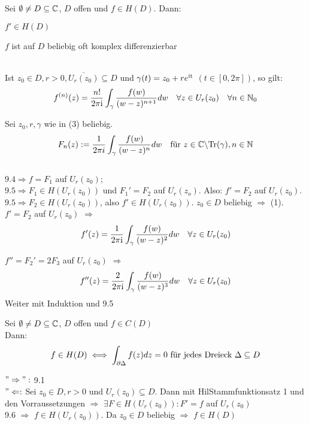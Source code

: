 \documentclass[a4paper,twoside,DIV15,BCOR12mm]{scrbook}
\def\gdw{\equizu}
\def\Tr{\text{Tr}}
\def\gdw{\equizu}
\def\ie{\rm i}
\begin{document}
\begin{satz}
Sei $\emptyset \neq D \subseteq \mathbb{C}$, $D$ offen und $f \in H(D)$. Dann:
\begin{liste}
\item $f' \in H(D)$
\item $f$ ist auf $D$ beliebig oft komplex differenzierbar
\item {} \\
      Ist $z_0 \in D, r>0, \overline{U_r(z_0)} \subseteq D$ und $\gamma(t) = z_0+ r e^{\ie t}$
       $(t \in [0, 2\pi])$, so gilt: \\
       \[f^{(n)}(z) = \frac{n!}{2\pi \ie} \int_{\gamma}
       \frac{f(w)}{(w-z)^{n+1}} dw \quad \forall z \in U_r(z_0) \quad \forall n
       \in \MdN_0 \] 
      
\end{liste}

\end{satz}
\begin{beweis}
Sei $z_0, r, \gamma$ wie in (3) beliebig. \\
\[ F_n(z) :=\frac{1}{2\pi i} \int_{\gamma} \frac{f(w)}{(w-z)^n} dw \quad \text{für } z\in \MdC
\backslash \Tr(\gamma), n \in \MdN\] \\
$9.4 \Rightarrow f = F_1$ auf $U_r(z_0)$; \\
$9.5 \Rightarrow F_1 \in H(U_r(z_0))$ und $F_1'=F_2$ auf $U_r(z_o)$. Also: $f'=F_2$ auf $U_r(z_0)$. $9.5 \Rightarrow F_2\in H(U_r(z_0))$, also $f' \in H(U_r(z_0))$. $z_0\in D$
beliebig $\Rightarrow$ (1). \\
$f' = F_2$ auf $U_r(z_0)$ $\Rightarrow$ 
\[
	f'(z) = \frac{1}{2\pi\ie}\int_{\gamma} \frac{f(w)}{(w-z)^2} dw \quad \forall z
	\in U_r(z_0)
 \]

$f'' = F_2' = 2F_3$ auf $U_r(z_0)$ $\Rightarrow$  \\
\[
	f''(z) = \frac{2}{2\pi\ie}\int_{\gamma} \frac{f(w)}{(w-z)^3} dw \quad \forall z
	\in U_r(z_0)
\]
Weiter mit Induktion und 9.5
\end{beweis}
\begin{satz}
Sei $\emptyset \neq D \subseteq \mathbb{C}$, $D$ offen und $f \in C(D)$\\
Dann: \[f\in H(D) \gdw \int_{\partial \Delta} f(z) dz = 0 \text{ für jedes
Dreieck } \Delta \subseteq D\]
\end{satz}
\begin{beweis}
$"\Rightarrow":$ 9.1 \\
$"\Leftarrow:$ Sei $z_0 \in D, r > 0$ und $U_r(z_0) \subseteq D$. Dann mit
HilStammfunktionsatz 1 und den Vorraussetzungen $\Rightarrow$ $\exists F \in H(U_r(z_0)):
F' = f$ auf $U_r(z_0)$ \\ 
9.6 $\Rightarrow$ $f \in H(U_r(z_0))$. Da $z_0 \in D$ beliebig $\Rightarrow$ $f
\in H(D)$
\end{beweis}
\end{document}
